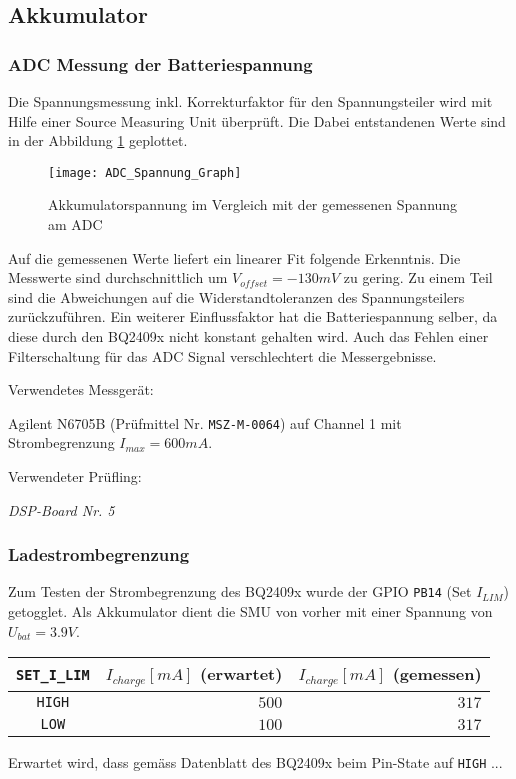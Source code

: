 \subsection{Akkumulator}
\label{sec:Valid_Batterie}

\subsubsection{ADC Messung der Batteriespannung}

Die Spannungsmessung inkl. Korrekturfaktor für den Spannungsteiler wird mit Hilfe einer Source Measuring Unit überprüft. Die Dabei entstandenen Werte sind in der Abbildung \ref{pic:ADC_Spannung_Graph} geplottet.

\begin{figure}[H]
	\centering
	\texttt{[image: ADC\_Spannung\_Graph]}
	\caption{Akkumulatorspannung im Vergleich mit der gemessenen Spannung am ADC}
	\label{pic:ADC_Spannung_Graph}
\end{figure}

Auf die gemessenen Werte liefert ein linearer Fit folgende Erkenntnis.
Die Messwerte sind durchschnittlich um $V_{offset}=-130\si{mV}$ zu gering.
Zu einem Teil sind die Abweichungen auf die Widerstandtoleranzen des Spannungsteilers zurückzuführen.
Ein weiterer Einflussfaktor hat die Batteriespannung selber, da diese durch den BQ2409x nicht konstant gehalten wird. Auch das Fehlen einer Filterschaltung für das ADC Signal verschlechtert die Messergebnisse.

Verwendetes Messgerät:

Agilent N6705B (Prüfmittel Nr. \texttt{MSZ-M-0064}) auf Channel 1 mit Strombegrenzung $I_{max}=600\si{mA}$.

Verwendeter Prüfling:

\textit{DSP-Board Nr. 5}


\subsubsection{Ladestrombegrenzung}

Zum Testen der Strombegrenzung des BQ2409x wurde der GPIO \texttt{PB14} (Set $I_{LIM}$) getogglet. Als Akkumulator dient die SMU von vorher mit einer Spannung von $U_{bat}=3.9\si{V}$.

\begin{table}[H]
	\centering
	\begin{tabular}{|c|r|r|}
		\hline
		\texttt{SET\_I\_LIM} & $I_{charge}[\si{mA}]$ (erwartet) &  $I_{charge}[\si{mA}]$ (gemessen) \\ \hline
		\texttt{HIGH}     &           $500$                  &          $317$             \\ \hline
		\texttt{LOW}      &           $100$                  &          $317$             \\ \hline
		\hline 
	\end{tabular}
\end{table}

Erwartet wird, dass gemäss Datenblatt des BQ2409x \cite{bq2409x} beim Pin-State auf \texttt{HIGH} ...






